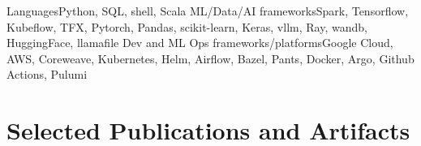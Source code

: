 \documentclass[print]{ag-cv} %
\begin{document}
\begin{skills}
  {Languages}{Python, SQL, shell, Scala}
  {ML/Data/AI frameworks}{Spark, Tensorflow, Kubeflow, TFX, Pytorch, Pandas, scikit-learn, Keras, vllm, Ray, wandb, HuggingFace, llamafile}
  {Dev and ML Ops frameworks/platforms}{Google Cloud, AWS, Coreweave, Kubernetes, Helm, Airflow, Bazel, Pants, Docker, Argo, Github Actions, Pulumi}
\end{skills}


\section*{Selected Publications and Artifacts}
  
  \newrefcontext[sorting=chronological]
  \nocite{network_induced_memory_contention,
    skullstrip,do_more_with_twitter_data} \leavevmode\printbibliography[heading=none,keyword={selected}] 
    
\end{document}
